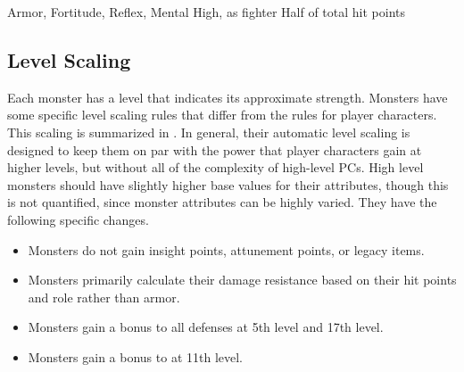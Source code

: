               Armor,  Fortitude,  Reflex,  Mental
             High, as fighter
             Half of total hit points

    \subsection{Level Scaling}
        Each monster has a level that indicates its approximate strength.
        Monsters have some specific level scaling rules that differ from the rules for player characters.
        This scaling is summarized in .
        In general, their automatic level scaling is designed to keep them on par with the power that player characters gain at higher levels, but without all of the complexity of high-level PCs.
        High level monsters should have slightly higher base values for their attributes, though this is not quantified, since monster attributes can be highly varied.
        They have the following specific changes.
        \begin{itemize}
            \item Monsters do not gain insight points, attunement points, or legacy items.
            \item Monsters primarily calculate their damage resistance based on their hit points and role rather than armor.
            \item Monsters gain a  bonus to all defenses at 5th level and 17th level.
            \item Monsters gain a  bonus to  at 11th level.
        \end{itemize}

